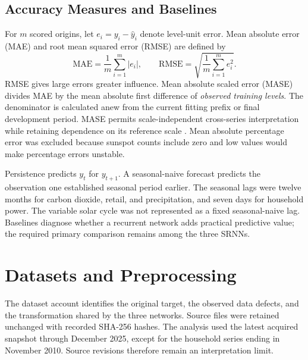 \documentclass[conference,10pt]{IEEEtran}
\begin{document}
\subsection{Accuracy Measures and Baselines}
For $m$ scored origins, let $e_i=y_i-\hat y_i$ denote level-unit error. Mean absolute error (MAE) and root mean squared error (RMSE) are defined by
\begin{equation}
\mathrm{MAE}=\frac{1}{m}\sum_{i=1}^{m}|e_i|,\qquad
\mathrm{RMSE}=\sqrt{\frac{1}{m}\sum_{i=1}^{m}e_i^2}.
\end{equation}
RMSE gives large errors greater influence. Mean absolute scaled error (MASE) divides MAE by the mean absolute first difference of \emph{observed training levels}. The denominator is calculated anew from the current fitting prefix or final development period. MASE permits scale-independent cross-series interpretation while retaining dependence on its reference scale \cite{hyndman2006accuracy}. Mean absolute percentage error was excluded because sunspot counts include zero and low values would make percentage errors unstable.

Persistence predicts $y_t$ for $y_{t+1}$. A seasonal-naive forecast predicts the observation one established seasonal period earlier. The seasonal lags were twelve months for carbon dioxide, retail, and precipitation, and seven days for household power. The variable solar cycle was not represented as a fixed seasonal-naive lag. Baselines diagnose whether a recurrent network adds practical predictive value; the required primary comparison remains among the three SRNNs.

\section{Datasets and Preprocessing}
The dataset account identifies the original target, the observed data defects, and the transformation shared by the three networks. Source files were retained unchanged with recorded SHA-256 hashes. The analysis used the latest acquired snapshot through December 2025, except for the household series ending in November 2010. Source revisions therefore remain an interpretation limit.
\end{document}
